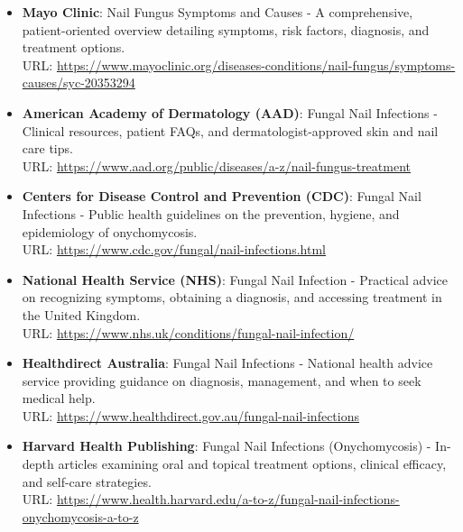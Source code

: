 \begin{itemize}
    \item \textbf{Mayo Clinic}: Nail Fungus Symptoms and Causes - A comprehensive, patient-oriented overview detailing symptoms, risk factors, diagnosis, and treatment options. \\
    URL: \url{https://www.mayoclinic.org/diseases-conditions/nail-fungus/symptoms-causes/syc-20353294}
    \item \textbf{American Academy of Dermatology (AAD)}: Fungal Nail Infections - Clinical resources, patient FAQs, and dermatologist-approved skin and nail care tips. \\
    URL: \url{https://www.aad.org/public/diseases/a-z/nail-fungus-treatment}
    \item \textbf{Centers for Disease Control and Prevention (CDC)}: Fungal Nail Infections - Public health guidelines on the prevention, hygiene, and epidemiology of onychomycosis. \\
    URL: \url{https://www.cdc.gov/fungal/nail-infections.html}
    \item \textbf{National Health Service (NHS)}: Fungal Nail Infection - Practical advice on recognizing symptoms, obtaining a diagnosis, and accessing treatment in the United Kingdom. \\
    URL: \url{https://www.nhs.uk/conditions/fungal-nail-infection/}
    \item \textbf{Healthdirect Australia}: Fungal Nail Infections - National health advice service providing guidance on diagnosis, management, and when to seek medical help. \\
    URL: \url{https://www.healthdirect.gov.au/fungal-nail-infections}
    \item \textbf{Harvard Health Publishing}: Fungal Nail Infections (Onychomycosis) - In-depth articles examining oral and topical treatment options, clinical efficacy, and self-care strategies. \\
    URL: \url{https://www.health.harvard.edu/a-to-z/fungal-nail-infections-onychomycosis-a-to-z}
\end{itemize}